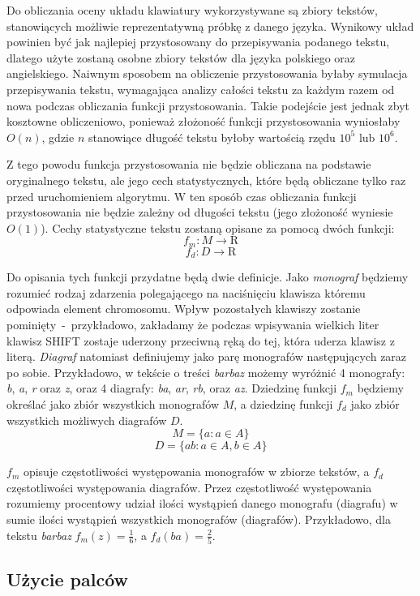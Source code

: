 \documentclass{xmgr}
\begin{document}
Do obliczania oceny układu klawiatury wykorzystywane są zbiory tekstów, stanowiących możliwie reprezentatywną próbkę z danego języka. Wynikowy układ powinien być jak najlepiej przystosowany do przepisywania podanego tekstu, dlatego użyte zostaną osobne zbiory tekstów dla języka polskiego oraz angielskiego. Naiwnym sposobem na obliczenie przystosowania byłaby symulacja przepisywania tekstu, wymagająca analizy całości tekstu za każdym razem od nowa podczas obliczania funkcji przystosowania. Takie podejście jest jednak zbyt kosztowne obliczeniowo, ponieważ złożoność funkcji przystosowania wyniosłaby $ O(n) $, gdzie $ n $ stanowiące długość tekstu byłoby wartością rzędu $ 10^5 $ lub $ 10^6 $.

Z tego powodu funkcja przystosowania nie będzie obliczana na podstawie oryginalnego tekstu, ale jego cech statystycznych, które będą obliczane tylko raz przed uruchomieniem algorytmu. W ten sposób czas obliczania funkcji przystosowania nie będzie zależny od długości tekstu (jego złożoność wyniesie $ O(1) $). Cechy statystyczne tekstu zostaną opisane za pomocą dwóch funkcji:
$$ f_m : M \rightarrow \mathrm{R} $$
$$ f_d : D \rightarrow \mathrm{R} $$

Do opisania tych funkcji przydatne będą dwie definicje. Jako \emph{monograf} będziemy rozumieć rodzaj zdarzenia polegającego na naciśnięciu klawisza któremu odpowiada element chromosomu. Wpływ pozostałych klawiszy zostanie pominięty~-~przykładowo, zakładamy że podczas wpisywania wielkich liter klawisz SHIFT zostaje uderzony przeciwną ręką do tej, która uderza klawisz z literą. \emph{Diagraf} natomiast definiujemy jako parę monografów następujących zaraz po sobie. Przykładowo, w tekście o treści \emph{barbaz} możemy wyróżnić 4 monografy: \emph{b}, \emph{a}, \emph{r} oraz \emph{z}, oraz 4 diagrafy: \emph{ba}, \emph{ar}, \emph{rb}, oraz \emph{az}. Dziedzinę funkcji $ f_m $ będziemy określać jako zbiór wszystkich monografów $ M $, a dziedzinę funkcji $ f_d $ jako zbiór wszystkich możliwych diagrafów $ D $.
$$ M = \{ a : a \in A \} $$
$$ D = \{ ab : a \in A, b \in A \} $$

$ f_m $ opisuje częstotliwości występowania monografów w zbiorze tekstów, a $ f_d $ częstotliwości występowania diagrafów. Przez częstotliwość występowania rozumiemy procentowy udział ilości wystąpień danego monografu (diagrafu) w sumie ilości wystąpień wszystkich monografów (diagrafów). Przykładowo, dla tekstu \emph{barbaz} $ f_m(z) = \frac{1}{6} $, a $ f_d(ba) = \frac{2}{5} $.


\subsection{Użycie palców}
\end{document}
